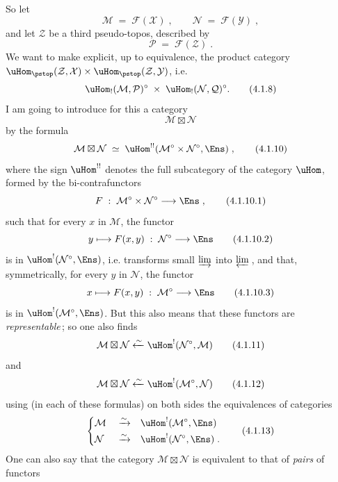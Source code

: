 So let
\[
\mathcal{M} \;=\; \mathcal{F}(\mathcal{X})\;, \qquad \mathcal{N} \;=\; \mathcal{F}(\mathcal{Y})\;,
\tag*{(4.1.6)}
\]
and let $\mathcal{Z}$ be a third pseudo-topos, described by
\[
\mathcal{P} \;=\; \mathcal{F}(\mathcal{Z})\;.
\tag*{(4.1.7)}
\]
We want to make explicit, up to equivalence, the product category $\uHom_{\pstop}(\mathcal{Z},\mathcal{X})\times\uHom_{\pstop}(\mathcal{Z},\mathcal{Y})$, i.e.
\[
\uHom_!(\mathcal{M},\mathcal{P})^\circ \;\times\; \uHom_!(\mathcal{N},\mathcal{Q})^\circ.
\tag*{(4.1.8)}
\] %
I am going to introduce for this a category
\[
\mathcal{M}\boxtimes\mathcal{N}
\tag*{(4.1.9)}
\]
by the formula
\[
\mathcal{M}\boxtimes\mathcal{N} \;\simeq\; \uHom^{!!}(\mathcal{M}^\circ\times\mathcal{N}^\circ,\Ens)\;,
\tag*{(4.1.10)}
\]
where the sign $\uHom^{!!}$ denotes the full subcategory of the category $\uHom$, formed by the bi-contrafunctors %
\[
F \;:\; \mathcal{M}^\circ\times\mathcal{N}^\circ \longrightarrow \Ens\;,
\tag*{(4.1.10.1)}
\]
such that for every $x$ in $\mathcal{M}$, the functor
\[
y \longmapsto F(x,y) \;:\; \mathcal{N}^\circ \longrightarrow \Ens
\tag*{(4.1.10.2)}
\]
is in $\uHom^!(\mathcal{N}^\circ,\Ens)$, i.e. transforms small $\varinjlim$ into $\varprojlim$\,, and that, symmetrically, for every $y$ in $\mathcal{N}$, the functor
\[
x \longmapsto F(x,y) \;:\; \mathcal{M}^\circ \longrightarrow \Ens
\tag*{(4.1.10.3)}
\]
is in $\uHom^!(\mathcal{M}^\circ,\Ens)$. But this also means that these functors are \textit{representable}\,; so one also finds
\[
\mathcal{M}\boxtimes\mathcal{N} \xleftarrow{\sim} \uHom^!(\mathcal{N}^\circ,\mathcal{M})
\tag*{(4.1.11)}
\]
and
\[
\mathcal{M}\boxtimes\mathcal{N} \xleftarrow{\sim} \uHom^!(\mathcal{M}^\circ,\mathcal{N})
\tag*{(4.1.12)}
\]
using (in each of these formulas) on both sides the equivalences of categories
\[
\left\{
\begin{aligned}
&\mathcal{M} &&\xrightarrow{\sim} &&\uHom^!(\mathcal{M}^\circ,\Ens)\\
&\mathcal{N} &&\xrightarrow{\sim} &&\uHom^!(\mathcal{N}^\circ,\Ens)\;.
\end{aligned}
\right.
\tag*{(4.1.13)}
\]
One can also say that the category $\mathcal{M}\boxtimes\mathcal{N}$ is equivalent to that of \textit{pairs} of functors
